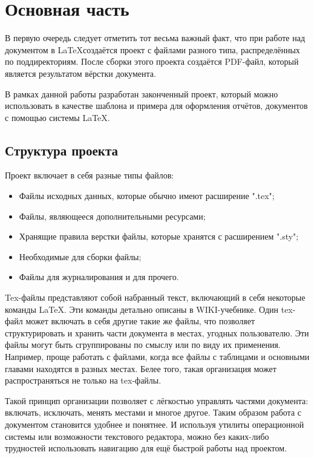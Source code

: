 \section{ Основная часть}
	В первую очередь следует отметить тот весьма важный факт, что при работе над документом в \LaTeX создаётся проект
	с файлами разного типа, распределённых по поддиректориям. После сборки этого проекта создаётся PDF-файл, который
	является результатом вёрстки документа.

	В рамках данной работы разработан законченный проект, который можно использовать в качестве шаблона и примера
	для оформления отчётов, документов с помощью системы \LaTeX.

	\subsection{Структура проекта}
		Проект включает в себя разные типы  файлов:
			\begin{itemize}
				\fontsize{0pt}{0pt}
				\setlength{\itemsep}{0pt}
				\item Файлы исходных данных, которые обычно имеют расширение ".tex"; 
				\item Файлы, являющееся дополнительными ресурсами;
				\item Хранящие правила верстки файлы, которые хранятся с расширением ".sty";
				\item Необходимые для сборки файлы;
				\item Файлы для журналирования и для прочего.
			\end{itemize}

			Tex-файлы представляют собой набранный текст, включающий в себя некоторые команды \LaTeX. Эти команды детально описаны
			в WIKI-учебнике. Один tex-файл может включать в себя другие такие же файлы, что позволяет структурировать и хранить 
			части документа в местах, угодных пользователю. Эти файлы могут быть сгруппированы по смыслу или по виду их 
			применения. Например, проще работать с файлами, когда все файлы с таблицами и основными главами находятся в
			разных местах. Белее того, такая организация может распространяться не только на tex-файлы.

			Такой принцип организации позволяет с лёгкостью управлять частями документа: включать, исключать, менять местами и многое другое.
			Таким образом работа с документом становится удобнее и понятнее. И используя утилиты операционной системы или возможности
			текстового редактора, можно без каких-либо трудностей использовать навигацию для ещё быстрой работы над проектом.

